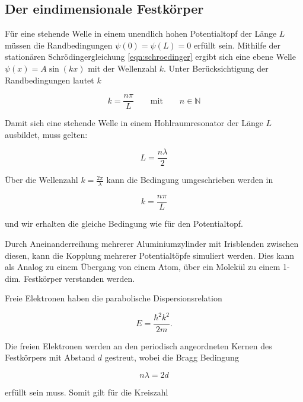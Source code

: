 \subsection{Der eindimensionale Festkörper}
\noindent
Für eine stehende Welle in einem unendlich hohen Potentialtopf der Länge $L$ müssen die Randbedingungen $ \psi(0) = \psi(L) = 0$ erfüllt sein.
Mithilfe der stationären Schrödingergleichung \ref{eqn:schroedinger} ergibt sich eine ebene Welle  $\psi(x) = A \sin(kx)$ mit der Wellenzahl $k$. Unter Berücksichtigung der Randbedingungen lautet $k$

\begin{equation}
  k = \frac{n \pi }{L} \qquad \text{mit} \qquad n \in \mathbb{N}
\end{equation}

\noindent
Damit sich eine stehende Welle in einem Hohlraumresonator der Länge $L$ ausbildet, muss gelten:

\begin{equation}
L = \frac{n\lambda}{2}
\end{equation}

\noindent
Über die Wellenzahl $k=\frac{2\pi}{\lambda}$ kann die Bedingung umgeschrieben werden in 

\begin{equation}
  k = \frac{n \pi }{L} 
\end{equation}

\noindent
und wir erhalten die gleiche Bedingung wie für den Potentialtopf.


\noindent
Durch Aneinanderreihung mehrerer Aluminiumzylinder mit Irisblenden zwischen diesen, kann die Kopplung mehrerer Potentialtöpfe simuliert werden. Dies kann als Analog zu einem Übergang von einem Atom, über ein Molekül zu einem 1-dim. Festkörper verstanden werden.

\noindent
Freie Elektronen haben die parabolische Dispersionsrelation

\begin{equation*}
  E = \frac{\hbar^2 k^2}{2m}.
\end{equation*}

\noindent
Die freien Elektronen werden an den periodisch angeordneten Kernen des Festkörpers mit Abstand $d$ gestreut, wobei die Bragg Bedingung

\begin{equation*}
  n \lambda = 2d 
\end{equation*}

\noindent
erfüllt sein muss. Somit gilt für die Kreiszahl

